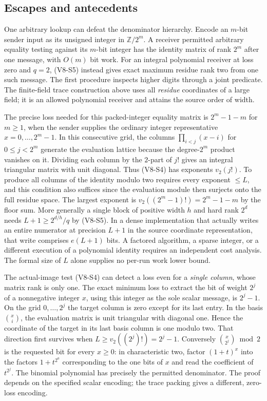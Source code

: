 \documentclass[
  11pt,
]{article}
\begin{document}
\subsection{Escapes and antecedents}\label{v8-escapes-and-antecedents}

One arbitrary lookup can defeat the denominator hierarchy. Encode an
\(m\)-bit sender input as its unsigned integer in \(\mathbb Z/2^m\). A
receiver permitted arbitrary equality testing against its \(m\)-bit
integer has the identity matrix of rank \(2^m\) after one message, with
\(O(m)\) bit work. For an integral polynomial receiver at loss zero and
\(q=2\), (V8-S5) instead gives exact maximum residue rank two from one such
message. The first procedure inspects higher digits through a joint
predicate. The finite-field trace construction above uses all
\emph{residue} coordinates of a large field; it is an allowed polynomial
receiver and attains the source order of width.

The precise loss needed for this packed-integer equality matrix is
\textbf{\(2^m-1-m\)} for \(m\ge1\), when the sender supplies the
ordinary integer representative \(x=0,\ldots,2^m-1\). In this
consecutive grid, the columns \(\prod_{i<j}(x-i)\) for \(0\le j<2^m\)
generate the evaluation lattice because the degree-\(2^m\) product
vanishes on it. Dividing each column by the \(2\)-part of \(j!\) gives
an integral triangular matrix with unit diagonal. Thus (V8-S4) has
exponents \(v_2(j!)\). To produce all columns of the identity modulo two
requires every exponent \(\le L\), and this condition also suffices
since the evaluation module then surjects onto the full residue space.
The largest exponent is \(v_2((2^m-1)!)=2^m-1-m\) by the floor sum. More
generally a single block of positive width \(h\) and hard rank \(2^d\)
needs \(L+1\ge 2^{d/h}/q\) by (V8-S5). In a dense implementation that
actually writes an entire numerator at precision \(L+1\) in the source
coordinate representation, that write comprises \(e(L+1)\) bits. A
factored algorithm, a sparse integer, or a different execution of a
polynomial identity requires an independent cost analysis. The formal
size of \(L\) alone supplies no per-run work lower bound.

The actual-image test (V8-S4) can detect a loss even for a \emph{single
column}, whose matrix rank is only one. The exact minimum loss to
extract the bit of weight \(2^j\) of a nonnegative integer \(x\), using
this integer as the sole scalar message, is \(2^j-1\). On the grid
\(0,\ldots,2^j\) the target column is zero except for its last entry. In
the basis \(\binom{x}{i}\), the evaluation matrix is unit triangular
with diagonal one. Hence the coordinate of the target in its last basis
column is one modulo two. That direction first survives when
\(L\ge v_2((2^j)!)=2^j-1\). Conversely \(\binom{x}{2^j}\bmod 2\) is the
requested bit for every \(x\ge0\): in characteristic two, factor
\((1+t)^x\) into the factors \(1+t^{2^a}\) corresponding to the one bits
of \(x\) and read the coefficient of \(t^{2^j}\). The binomial
polynomial has precisely the permitted denominator. The proof depends on
the specified scalar encoding; the trace packing gives a different,
zero-loss encoding.
\end{document}
